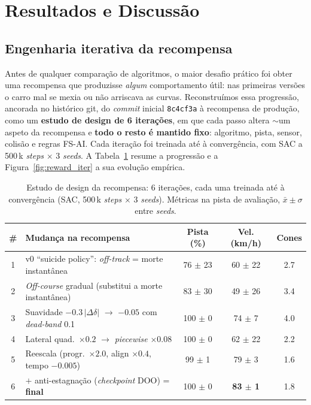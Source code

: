 \documentclass[runningheads]{llncs}
\begin{document}
\section{Resultados e Discussão}

\subsection{Engenharia iterativa da recompensa}
\label{sec:reward_iter}

Antes de qualquer comparação de algoritmos, o maior desafio prático foi obter uma recompensa que produzisse \emph{algum} comportamento útil: nas primeiras versões o carro mal se mexia ou não arriscava as curvas. Reconstruímos essa progressão, ancorada no histórico git, do \textit{commit} inicial \texttt{8c4cf3a} à recompensa de produção, como um \textbf{estudo de design de 6 iterações}, em que cada passo altera $\sim$um aspeto da recompensa e \textbf{todo o resto é mantido fixo}: algoritmo, pista, sensor, colisão e regras FS-AI. Cada iteração foi treinada até à convergência, com SAC a 500\,k \textit{steps} $\times$ 3 \textit{seeds}. A Tabela~\ref{tab:reward_iter} resume a progressão e a Figura~\ref{fig:reward_iter} a sua evolução empírica.

\begin{table}[t]
\centering
\caption{Estudo de design da recompensa: 6 iterações, cada uma treinada até à convergência (SAC, 500\,k \textit{steps} $\times$ 3 \textit{seeds}). Métricas na pista de avaliação, $\bar{x}\pm\sigma$ entre \textit{seeds}.}
\label{tab:reward_iter}
\small
\begin{tabular}{clccc}
\toprule
\textbf{\#} & \textbf{Mudança na recompensa} & \textbf{Pista (\%)} & \textbf{Vel. (km/h)} & \textbf{Cones} \\
\midrule
1 & v0 ``suicide policy'': \textit{off-track} = morte instantânea & 76 $\pm$ 23 & 60 $\pm$ 22 & 2.7 \\
2 & \textit{Off-course} gradual (substitui a morte instantânea) & 83 $\pm$ 30 & 49 $\pm$ 26 & 3.4 \\
3 & Suavidade $-0.3\,|\Delta\delta|$ $\rightarrow$ $-0.05$ com \textit{dead-band} 0.1 & 100 $\pm$ 0 & 74 $\pm$ 7 & 4.0 \\
4 & Lateral quad.\ $\times 0.2$ $\rightarrow$ \textit{piecewise} $\times 0.08$ & 100 $\pm$ 0 & 62 $\pm$ 22 & 2.2 \\
5 & Reescala (progr.\ $\times 2.0$, align $\times 0.4$, tempo $-0.005$) & 99 $\pm$ 1 & 79 $\pm$ 3 & 1.6 \\
6 & $+$ anti-estagnação (\textit{checkpoint} DOO) = \textbf{final} & 100 $\pm$ 0 & \textbf{83 $\pm$ 1} & 1.8 \\
\bottomrule
\end{tabular}
\end{table}
\end{document}
